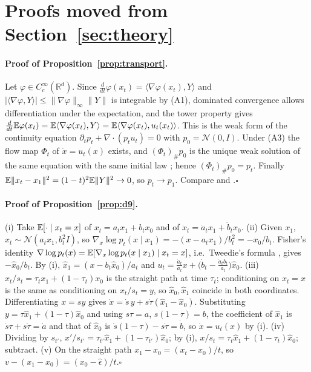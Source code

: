 \section{Proofs moved from Section~\ref{sec:theory}}\label{app:proofs}
\paragraph{Proof of Proposition~\ref{prop:transport}.}
Let $\varphi\in C_c^\infty(\mathbb R^d)$. Since $\frac{d}{dt}\varphi(x_t)=\langle\nabla\varphi(x_t),Y\rangle$ and $|\langle\nabla\varphi,Y\rangle|\le\|\nabla\varphi\|_\infty\|Y\|$ is integrable by (A1), dominated convergence allows differentiation under the expectation, and the tower property gives
$\tfrac{d}{dt}\mathbb{E}\varphi(x_t)=\mathbb{E}\langle\nabla\varphi(x_t),Y\rangle=\mathbb{E}\langle\nabla\varphi(x_t),u_t(x_t)\rangle$.
This is the weak form of the continuity equation $\partial_tp_t+\nabla\cdot(p_tu_t)=0$ with $p_0=\mathcal N(0,I)$. Under (A3) the flow map $\Phi_t$ of $\dot x=u_t(x)$ exists, and $(\Phi_t)_\#p_0$ is the unique weak solution of the same equation with the same initial law \citep{villani2009ot}; hence $(\Phi_t)_\#p_0=p_t$. Finally $\mathbb{E}\|x_t-x_1\|^2=(1-t)^2\mathbb{E}\|Y\|^2\to0$, so $p_t\to p_1$. Compare \citet[Theorem~1]{lipman2023fm} and \citet[Theorem~3.3]{liu2023rf}.\hfill$\square$

\paragraph{Proof of Proposition~\ref{prop:d9}.}
(i) Take $\mathbb{E}[\cdot\mid x_t=x]$ of $x_t=a_tx_1+b_tx_0$ and of $\dot x_t=\dot a_tx_1+\dot b_tx_0$.
(ii) Given $x_1$, $x_t\sim\mathcal N(a_tx_1,b_t^2I)$, so $\nabla_x\log p_t(x\mid x_1)=-(x-a_tx_1)/b_t^2=-x_0/b_t$. Fisher's identity $\nabla\log p_t(x)=\mathbb{E}[\nabla_x\log p_t(x\mid x_1)\mid x_t=x]$, i.e.\ Tweedie's formula \citep{efron2011tweedie}, gives $-\hat x_0/b_t$. By (i), $\hat x_1=(x-b_t\hat x_0)/a_t$ and $u_t=\frac{\dot a_t}{a_t}x+\big(\dot b_t-\frac{\dot a_tb_t}{a_t}\big)\hat x_0$.
(iii) $x_t/s_t=\tau_tx_1+(1-\tau_t)x_0$ is the straight path at time $\tau_t$; conditioning on $x_t=x$ is the same as conditioning on $x_t/s_t=y$, so $\hat x_0,\hat x_1$ coincide in both coordinates. Differentiating $x=sy$ gives $\dot x=\dot s\,y+s\dot\tau(\hat x_1-\hat x_0)$. Substituting $y=\tau\hat x_1+(1-\tau)\hat x_0$ and using $s\tau=a$, $s(1-\tau)=b$, the coefficient of $\hat x_1$ is $\dot s\tau+s\dot\tau=\dot a$ and that of $\hat x_0$ is $\dot s(1-\tau)-s\dot\tau=\dot b$, so $\dot x=u_t(x)$ by (i).
(iv) Dividing by $s_{t'}$, $x'/s_{t'}=\tau_{t'}\hat x_1+(1-\tau_{t'})\hat x_0$; by (i), $x/s_t=\tau_t\hat x_1+(1-\tau_t)\hat x_0$; subtract.
(v) On the straight path $x_1-x_0=(x_t-x_0)/t$, so $v-(x_1-x_0)=(x_0-\hat\epsilon)/t$.\hfill$\square$

